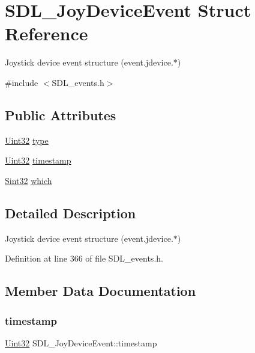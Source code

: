 \hypertarget{struct_s_d_l___joy_device_event}{}\section{S\+D\+L\+\_\+\+Joy\+Device\+Event Struct Reference}
\label{struct_s_d_l___joy_device_event}


Joystick device event structure (event.\+jdevice.$\ast$)  




{\ttfamily \#include $<$S\+D\+L\+\_\+events.\+h$>$}

\subsection*{Public Attributes}
\begin{DoxyCompactItemize}
\item 
\mbox{\hyperlink{_s_d_l__stdinc_8h_add440eff171ea5f55cb00c4a9ab8672d}{Uint32}} \mbox{\hyperlink{struct_s_d_l___joy_device_event_a51f060ba1dd5669b458e9c97aece667e}{type}}
\item 
\mbox{\hyperlink{_s_d_l__stdinc_8h_add440eff171ea5f55cb00c4a9ab8672d}{Uint32}} \mbox{\hyperlink{struct_s_d_l___joy_device_event_a5c4a9271bfff5d5c2e09a0dc732df8f3}{timestamp}}
\item 
\mbox{\hyperlink{_s_d_l__stdinc_8h_a7a90b941db9d4582e9ad7abb9940ff7e}{Sint32}} \mbox{\hyperlink{struct_s_d_l___joy_device_event_af9b295798f033b799ebbda7de6cb5a7e}{which}}
\end{DoxyCompactItemize}


\subsection{Detailed Description}
Joystick device event structure (event.\+jdevice.$\ast$) 

Definition at line 366 of file S\+D\+L\+\_\+events.\+h.



\subsection{Member Data Documentation}
\mbox{\label{struct_s_d_l___joy_device_event_a5c4a9271bfff5d5c2e09a0dc732df8f3}} 
\subsubsection{\texorpdfstring{timestamp}{timestamp}}
{\footnotesize\ttfamily \mbox{\hyperlink{_s_d_l__stdinc_8h_add440eff171ea5f55cb00c4a9ab8672d}{Uint32}} S\+D\+L\+\_\+\+Joy\+Device\+Event\+::timestamp}

